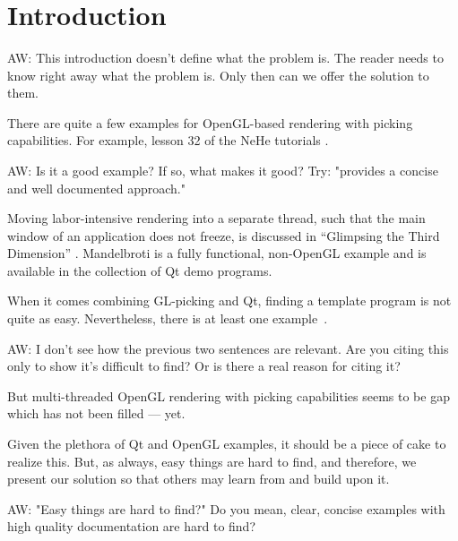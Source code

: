 \documentclass[jou,noapacite]{apa}
\title{
\mytitle
}
\begin{document}
\maketitle
%
%
\section{Introduction}
\label{sec:Introduction}

\begin{TODO}
AW: This introduction doesn't define what the problem is. The reader needs to
know right away what the problem is. Only then can we offer the solution to
them.
\end{TODO}

There are quite a few examples for OpenGL-based rendering with picking
capabilities.
%
For example, lesson 32 of the NeHe tutorials \cite{nehe32}.
\begin{TODO}
AW: Is it a good example? If so, what makes it good? Try: "provides a concise and well documented approach."
\end{TODO}
%
Moving labor-intensive rendering into a separate thread, such that the main
window of an application does not freeze, is discussed in ``Glimpsing the Third
Dimension'' \cite{glimpse3d}. Mandelbroti is a fully functional, non-OpenGL
example and is available in the collection of Qt demo programs.

When it comes combining GL-picking and Qt, finding a template program is not
quite as easy.
%
Nevertheless, there is at least one example~\cite{Blanchette2008}.
\begin{TODO}
AW: I don't see how the previous two sentences are relevant. Are you citing
this only to show it's difficult to find? Or is there a real reason for
citing it?
\end{TODO}
%
But multi-threaded OpenGL rendering with picking capabilities seems to be gap
which has not been filled — yet.

Given the plethora of Qt and OpenGL examples, it should be a piece of cake to
realize this.
%
But, as always, easy things are hard to find, and therefore, we present our
solution so that others may learn from and build upon it.
\begin{TODO}
AW: "Easy things are hard to find?" Do you mean, clear, concise examples with
high quality documentation are hard to find?
\end{TODO}
\end{document}
